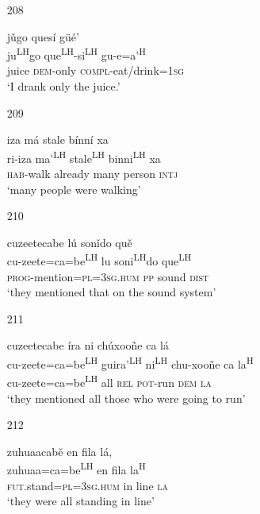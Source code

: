 \begin{itemize}
\item [208]

\glll j\v{u}go ques\'{i} g\"{u}\'{e}'\\
ju\textsuperscript{LH}go que\textsuperscript{LH}-si\textsuperscript{LH} gu-e=a'\textsuperscript{H}\\
juice \textsc{dem}-only \textsc{compl}-eat/drink=\textsc{1sg}\\
\glt `I drank only the juice.'  



\item[209]
 
\glll   iza m\'{a} stale b\'{i}nn\'{i} xa\\
ri-iza ma'\textsuperscript{LH} stale\textsuperscript{LH} binni\textsuperscript{LH} xa\\
\textsc{hab}-walk already many person \textsc{intj}\\
\glt `many people were walking'
 


\item[210]
 
\glll   cuzeetecabe l\'{u} son\v{i}do qu\v{e}\\
 cu-zeete=ca=be\textsuperscript{LH} lu soni\textsuperscript{LH}do que\textsuperscript{LH}\\
\textsc{prog}-mention=\textsc{pl}=\textsc{3sg.hum} \textsc{pp} sound \textsc{dist}\\
\glt `they mentioned that on the sound system'
 



\item[211]
 
\glll   cuzeetecabe \'{i}ra ni ch\'{u}xoo\~{n}e ca l\'{a}\\
cu-zeete=ca=be\textsuperscript{LH} guira'\textsuperscript{LH} ni\textsuperscript{LH} chu-xoo\~{n}e ca la\textsuperscript{H}\\
cu-zeete=ca=be\textsuperscript{LH} all \textsc{rel} \textsc{pot}-run \textsc{dem} \textsc{la}\\
\glt `they mentioned all those who were going to run'
 


\item[212]
 
\glll   zuhuaacab\v{e} en fila l\'{a}, \\
zuhuaa=ca=be\textsuperscript{LH}  en fila la\textsuperscript{H}\\
\textsc{fut}.stand=\textsc{pl}=\textsc{3sg.hum} in line \textsc{la}\\
\glt `they were all standing in line'
 



\end{itemize}
